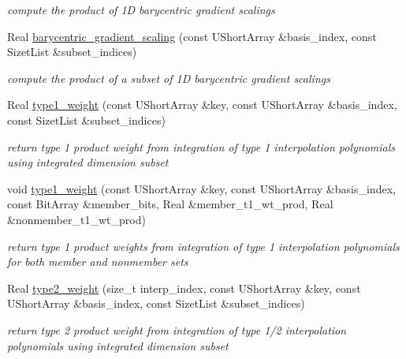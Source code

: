 \begin{DoxyCompactItemize}
\begin{DoxyCompactList}\small\item\em compute the product of 1D barycentric gradient scalings \end{DoxyCompactList}\item 
Real \hyperlink{classPecos_1_1SharedInterpPolyApproxData_a4e79a558ac8c7fbcde9c5e32cabd5570}{barycentric\+\_\+gradient\+\_\+scaling} (const U\+Short\+Array \&basis\+\_\+index, const Sizet\+List \&subset\+\_\+indices)\label{classPecos_1_1SharedInterpPolyApproxData_a4e79a558ac8c7fbcde9c5e32cabd5570}

\begin{DoxyCompactList}\small\item\em compute the product of a subset of 1D barycentric gradient scalings \end{DoxyCompactList}\item 
Real \hyperlink{classPecos_1_1SharedInterpPolyApproxData_a8678f730daa3e7ec66203c3533e7acaa}{type1\+\_\+weight} (const U\+Short\+Array \&key, const U\+Short\+Array \&basis\+\_\+index, const Sizet\+List \&subset\+\_\+indices)
\begin{DoxyCompactList}\small\item\em return type 1 product weight from integration of type 1 interpolation polynomials using integrated dimension subset \end{DoxyCompactList}\item 
void \hyperlink{classPecos_1_1SharedInterpPolyApproxData_a918e8806a0ff6806ba99e55affe9a04f}{type1\+\_\+weight} (const U\+Short\+Array \&key, const U\+Short\+Array \&basis\+\_\+index, const Bit\+Array \&member\+\_\+bits, Real \&member\+\_\+t1\+\_\+wt\+\_\+prod, Real \&nonmember\+\_\+t1\+\_\+wt\+\_\+prod)
\begin{DoxyCompactList}\small\item\em return type 1 product weights from integration of type 1 interpolation polynomials for both member and nonmember sets \end{DoxyCompactList}\item 
Real \hyperlink{classPecos_1_1SharedInterpPolyApproxData_a254f6c1d6c1a0a64298957e4428c10a4}{type2\+\_\+weight} (size\+\_\+t interp\+\_\+index, const U\+Short\+Array \&key, const U\+Short\+Array \&basis\+\_\+index, const Sizet\+List \&subset\+\_\+indices)
\begin{DoxyCompactList}\small\item\em return type 2 product weight from integration of type 1/2 interpolation polynomials using integrated dimension subset \end{DoxyCompactList}\item 

\end{DoxyCompactItemize}
